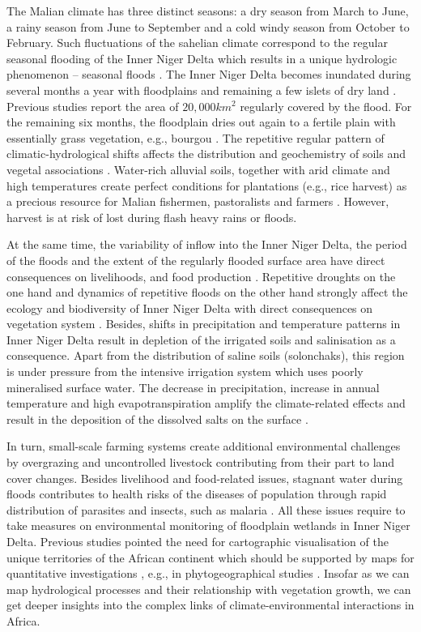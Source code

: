 \documentclass[12pt,a4paper,oneside]{article}
\def \newpar{\vspace{6pt}}
\begin{document}
\newpar The Malian climate has three distinct seasons: a dry season from March to June, a rainy season from June to September and a cold windy season from October to February. Such fluctuations of the sahelian climate correspond to the regular seasonal flooding of the Inner Niger Delta which results in a unique hydrologic phenomenon -- seasonal floods \citep{brunet1986monographie}. The Inner Niger Delta becomes inundated during several months a year with floodplains and remaining a few islets of dry land \citep{Courel}. Previous studies report \citep{Diakite} the area of $20,000 km^2$ regularly covered by the flood. For the remaining six months, the floodplain dries out again to a fertile plain with essentially grass vegetation, e.g., bourgou \citep{Planhol}. The repetitive regular pattern of climatic-hydrological shifts affects the distribution and geochemistry of soils and vegetal associations \citep{Tabeaud}. Water-rich alluvial soils, together with arid climate and high temperatures create perfect conditions for plantations (e.g., rice harvest) as a precious resource for Malian fishermen, pastoralists and farmers \citep{Retaille}. However, harvest is at risk of lost during flash heavy rains or floods. 

\newpar At the same time, the variability of inflow into the Inner Niger Delta, the period of the floods and the extent of the regularly flooded surface area have direct consequences on livelihoods, and food production \citep{LIERSCH201318}. Repetitive droughts on the one hand and dynamics of repetitive floods on the other hand strongly affect the ecology and biodiversity of Inner Niger Delta with direct consequences on vegetation system \citep{mariko2003caracterisation}. Besides, shifts in precipitation and temperature patterns in Inner Niger Delta result in depletion of the irrigated soils and salinisation as a consequence. Apart from the distribution of saline soils (solonchaks), this region is under pressure from the intensive irrigation system which uses poorly mineralised surface water. The decrease in precipitation, increase in annual temperature and high evapotranspiration amplify the climate-related effects and result in the deposition of the dissolved salts on the surface \citep{Valenza}. 

\newpar In turn, small-scale farming systems create additional environmental challenges by overgrazing and uncontrolled livestock contributing from their part to land cover changes. Besides livelihood and food-related issues, stagnant water during floods contributes to health risks of the diseases of population through rapid distribution of parasites and insects, such as malaria \citep{COOLS201334,Klinkenberg}. All these issues require to take measures on environmental monitoring of floodplain wetlands in Inner Niger Delta. Previous studies pointed the need for cartographic visualisation of the unique territories of the African continent which should be supported by maps for quantitative investigations \citep{Cabot1968}, e.g., in phytogeographical studies \citep{Robequain}. Insofar as we can map hydrological processes and their relationship with vegetation growth, we can get deeper insights into the complex links of climate-environmental interactions in Africa.
\end{document}
